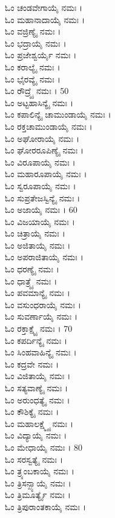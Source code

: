 \begin{multicols}{2}
ಓಂ ಚಂಡವೇಗಾಯೈ ನಮಃ ।\\
ಓಂ ಮಹಾನಾದಾಯೈ ನಮಃ ।\\
ಓಂ ವಜ್ರಿಣ್ಯೈ ನಮಃ ।\\
ಓಂ ಭದ್ರಾಯೈ ನಮಃ ।\\
ಓಂ ಪ್ರಜೇಶ್ವರ್ಯೈ ನಮಃ ।\\
ಓಂ ಕರಾಲ್ಯೈ ನಮಃ ।\\
ಓಂ ಭೈರವ್ಯೈ ನಮಃ ।\\
ಓಂ ರೌದ್ರ್ಯೈ ನಮಃ । 50\\
ಓಂ ಅಟ್ಟಹಾಸಿನ್ಯೈ ನಮಃ ।\\
ಓಂ ಕಪಾಲಿನ್ಯೈ ಚಾಮುಂಡಾಯೈ ನಮಃ ।\\
ಓಂ ರಕ್ತಚಾಮುಂಡಾಯೈ ನಮಃ ।\\
ಓಂ ಅಘೋರಾಯೈ ನಮಃ ।\\
ಓಂ ಘೋರರೂಪಿಣ್ಯೈ ನಮಃ ।\\
ಓಂ ವಿರೂಪಾಯೈ ನಮಃ ।\\
ಓಂ ಮಹಾರೂಪಾಯೈ ನಮಃ ।\\
ಓಂ ಸ್ವರೂಪಾಯೈ ನಮಃ ।\\
ಓಂ ಸುಪ್ರತೇಜಸ್ವಿನ್ಯೈ ನಮಃ ।\\
ಓಂ ಅಜಾಯೈ ನಮಃ । 60\\
ಓಂ ವಿಜಯಾಯೈ ನಮಃ ।\\
ಓಂ ಚಿತ್ರಾಯೈ ನಮಃ ।\\
ಓಂ ಅಜಿತಾಯೈ ನಮಃ ।\\
ಓಂ ಅಪರಾಜಿತಾಯೈ ನಮಃ ।\\
ಓಂ ಧರಣ್ಯೈ ನಮಃ ।\\
ಓಂ ಧಾತ್ರ್ಯೈ ನಮಃ ।\\
ಓಂ ಪವಮಾನ್ಯೈ ನಮಃ ।\\
ಓಂ ವಸುಂಧರಾಯೈ ನಮಃ ।\\
ಓಂ ಸುವರ್ಣಾಯೈ ನಮಃ ।\\
ಓಂ ರಕ್ತಾಕ್ಷ್ಯೈ ನಮಃ । 70\\
ಓಂ ಕಪರ್ದಿನ್ಯೈ ನಮಃ ।\\
ಓಂ ಸಿಂಹವಾಹಿನ್ಯೈ ನಮಃ ।\\
ಓಂ ಕದ್ರವೇ ನಮಃ ।\\
ಓಂ ವಿಜಿತಾಯೈ ನಮಃ ।\\
ಓಂ ಸತ್ಯವಾಣ್ಯೈ ನಮಃ ।\\
ಓಂ ಅರುಂಧತ್ಯೈ ನಮಃ ।\\
ಓಂ ಕೌಶಿಕ್ಯೈ ನಮಃ ।\\
ಓಂ ಮಹಾಲಕ್ಷ್ಮ್ಯೈ ನಮಃ ।\\
ಓಂ ವಿದ್ಯಾಯೈ ನಮಃ ।\\
ಓಂ ಮೇಧಾಯೈ ನಮಃ । 80\\
ಓಂ ಸರಸ್ವತ್ಯೈ ನಮಃ ।\\
ಓಂ ತ್ರ್ಯಂಬಕಾಯೈ ನಮಃ ।\\
ಓಂ ತ್ರಿಸನ್ಖ್ಯಾಯೈ ನಮಃ ।\\
ಓಂ ತ್ರಿಮೂರ್ತ್ಯೈ ನಮಃ ।\\
ಓಂ ತ್ರಿಪುರಾಂತಕಾಯೈ ನಮಃ ।\\

\end{multicols}
